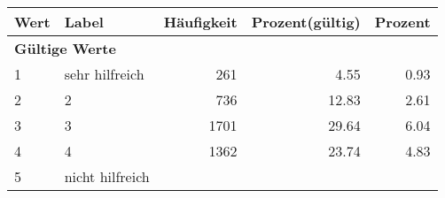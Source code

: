      \begin{longtable}{lXrrr}
     \toprule
     \textbf{Wert} & \textbf{Label} & \textbf{Häufigkeit} & \textbf{Prozent(gültig)} & \textbf{Prozent} \\
     \endhead
     \midrule
     \multicolumn{5}{l}{\textbf{Gültige Werte}}\\

     1 &
     \multicolumn{1}{X}{ sehr hilfreich   } &


       \num{261} &
       \num[round-mode=places,round-precision=2]{4.55} &
         \num[round-mode=places,round-precision=2]{0.93} \\

     2 &
     \multicolumn{1}{X}{ 2   } &


       \num{736} &
       \num[round-mode=places,round-precision=2]{12.83} &
         \num[round-mode=places,round-precision=2]{2.61} \\

     3 &
     \multicolumn{1}{X}{ 3   } &


       \num{1701} &
       \num[round-mode=places,round-precision=2]{29.64} &
         \num[round-mode=places,round-precision=2]{6.04} \\

     4 &
     \multicolumn{1}{X}{ 4   } &


       \num{1362} &
       \num[round-mode=places,round-precision=2]{23.74} &
         \num[round-mode=places,round-precision=2]{4.83} \\

     5 &
     \multicolumn{1}{X}{ nicht hilfreich   } &



\end{longtable}
